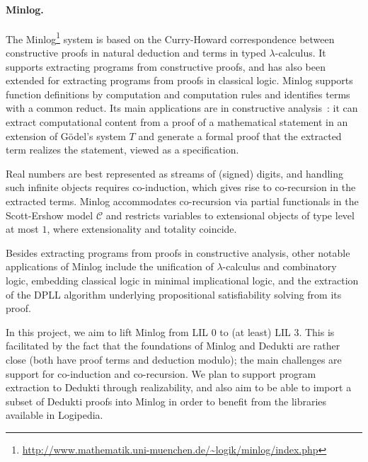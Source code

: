 \paragraph*{Minlog.}
The
Minlog\footnote{\url{http://www.mathematik.uni-muenchen.de/~logik/minlog/index.php}}
system is based on the Curry-Howard correspondence between constructive proofs
in natural deduction and terms in typed $\lambda$-calculus. It supports
extracting programs from constructive proofs, and has also been extended for extracting
programs from proofs in classical logic. Minlog supports function definitions by
computation and computation rules and identifies terms with a common reduct. Its
main applications are in constructive analysis~\cite{miyamoto:real}: it can extract
computational content from a proof of a mathematical statement in an extension
of G\"odel's system $T$ and generate a formal proof that the extracted term
realizes the statement, viewed as a specification.

Real numbers are best represented as streams of (signed) digits, and handling
such infinite objects requires co-induction, which gives rise to co-recursion in
the extracted terms. Minlog accommodates co-recursion via partial functionals in
the Scott-Ershow model $\mathcal{C}$ and restricts variables to extensional
objects of type level at most $1$, where extensionality and totality coincide.

Besides extracting programs from proofs in constructive analysis, other notable
applications of Minlog include the unification of $\lambda$-calculus and
combinatory logic, embedding classical logic in minimal implicational logic, and
the extraction of the DPLL algorithm underlying propositional satisfiability
solving from its proof.

In this project, we aim to lift Minlog from LIL $0$ to (at least) LIL $3$.
This is facilitated by the fact that the foundations of Minlog and Dedukti are
rather close (both have proof terms and deduction modulo); the main challenges
are support for co-induction and co-recursion. We plan to support program
extraction to Dedukti through realizability, and also aim to be able to
import a subset of Dedukti proofs into Minlog in order to benefit from the
libraries available in Logipedia.

